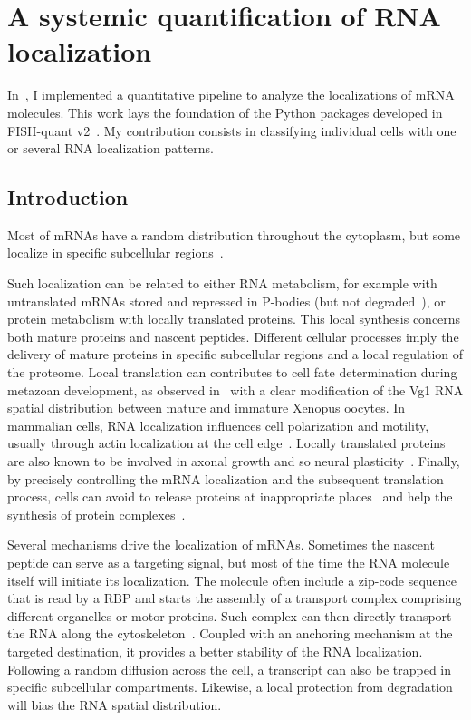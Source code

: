 \section{A systemic quantification of RNA localization}
\label{sec:general_pattern_recognition}

In~\cite{CHOUAIB_2020}, I implemented a quantitative pipeline to analyze the localizations of \ac{mRNA} molecules.
This work lays the foundation of the Python packages developed in FISH-quant v2~\cite{Imbert_fq_2022}.
My contribution consists in classifying individual cells with one or several \ac{RNA} localization patterns.

\subsection{Introduction}
\label{subsec:introduction_general_pattern}

Most of \ac{mRNA}s have a random distribution throughout the cytoplasm, but some localize in specific subcellular regions~\cite{Blower_2013, Jung_2014, Eliscovich_2017, Bovaird_2018}.

Such localization can be related to either \ac{RNA} metabolism, for example with untranslated \ac{mRNA}s stored and repressed in \ac{P-bodies} (but not degraded~\cite{Hubstenberger_2017}), or  protein metabolism with locally translated proteins.
This local synthesis concerns both mature proteins and nascent peptides.
Different cellular processes imply the delivery of mature proteins in specific subcellular regions and a local regulation of the proteome.
Local translation can contributes to cell fate determination during metazoan development, as observed in~\cite{melton_translocation_1987} with a clear modification of the Vg1 \ac{RNA} spatial distribution between mature and immature Xenopus oocytes.
In mammalian cells, \ac{RNA} localization influences cell polarization and motility, usually through actin localization at the cell edge~\cite{Lawrence_1986}.
Locally translated proteins are also known to be involved in axonal growth and so neural plasticity~\cite{VanDriesche_2018}.
Finally, by precisely controlling the \ac{mRNA} localization and the subsequent translation process, cells can avoid to release proteins at inappropriate places~\cite{Muller_myelin_2013} and help the synthesis of protein complexes~\cite{pichon_visualization_2016}.

Several mechanisms drive the localization of \ac{mRNA}s.
Sometimes the nascent peptide can serve as a targeting signal, but most of the time the \ac{RNA} molecule itself will initiate its localization.
The molecule often include a zip-code sequence that is read by a \ac{RBP} and starts the assembly of a transport complex comprising different organelles or motor proteins.
Such complex can then directly transport the \ac{RNA} along the cytoskeleton~\cite{Blower_2013}.
Coupled with an anchoring mechanism at the targeted destination, it provides a better stability of the \ac{RNA} localization.
Following a random diffusion across the cell, a transcript can also be trapped in specific subcellular compartments.
Likewise, a local protection from degradation will bias the \ac{RNA} spatial distribution.


